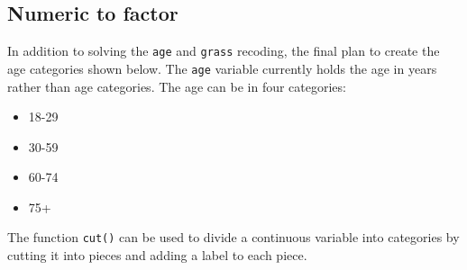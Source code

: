 \documentclass[
]{book}
\newenvironment{Shaded}{\begin{snugshade}}{\end{snugshade}}
\newcommand{\AttributeTok}[1]{\textcolor[rgb]{0.77,0.63,0.00}{#1}}
\newcommand{\CommentTok}[1]{\textcolor[rgb]{0.56,0.35,0.01}{\textit{#1}}}
\newcommand{\FloatTok}[1]{\textcolor[rgb]{0.00,0.00,0.81}{#1}}
\newcommand{\FunctionTok}[1]{\textcolor[rgb]{0.00,0.00,0.00}{#1}}
\newcommand{\NormalTok}[1]{#1}
\newcommand{\OtherTok}[1]{\textcolor[rgb]{0.56,0.35,0.01}{#1}}
\newcommand{\SpecialCharTok}[1]{\textcolor[rgb]{0.00,0.00,0.00}{#1}}
\newcommand{\StringTok}[1]{\textcolor[rgb]{0.31,0.60,0.02}{#1}}
\providecommand{\tightlist}{%
  \setlength{\itemsep}{0pt}\setlength{\parskip}{0pt}}
\begin{document}
\begin{Shaded}
\end{Shaded}

\hypertarget{numeric-to-factor}{%
\subsection{Numeric to factor}\label{numeric-to-factor}}

In addition to solving the \texttt{age} and \texttt{grass} recoding, the final plan to create the age categories shown below. The \texttt{age} variable currently holds the age in years rather than age categories. The age can be in four categories:

\begin{itemize}
\tightlist
\item
  18-29
\item
  30-59
\item
  60-74
\item
  75+
\end{itemize}

The function \texttt{cut()} can be used to divide a continuous variable into categories by cutting it into pieces and adding a label to each piece.
\end{document}
